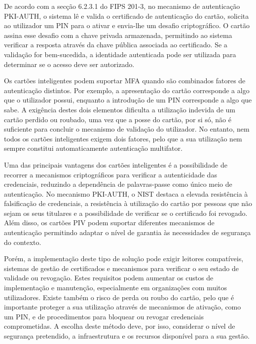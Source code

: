 \hspace{1cm} De acordo com a secção 6.2.3.1 do FIPS 201-3, no mecanismo de autenticação PKI-AUTH, o sistema lê e valida o certificado de autenticação do cartão, solicita ao utilizador um PIN para o ativar e envia-lhe um desafio criptográfico. O cartão assina esse desafio com a chave privada armazenada, permitindo ao sistema verificar a resposta através da chave pública associada ao certificado. Se a validação for bem-sucedida, a identidade autenticada pode ser utilizada para determinar se o acesso deve ser autorizado.

\hspace{1cm} Os cartões inteligentes podem suportar MFA quando são combinados fatores de autenticação distintos. Por exemplo, a apresentação do cartão corresponde a algo que o utilizador possui, enquanto a introdução de um PIN corresponde a algo que sabe. A exigência destes dois elementos dificulta a utilização indevida de um cartão perdido ou roubado, uma vez que a posse do cartão, por si só, não é suficiente para concluir o mecanismo de validação do utilizador. No entanto, nem todos os cartões inteligentes exigem dois fatores, pelo que a sua utilização nem sempre constitui automaticamente autenticação multifator.

\hspace{1cm} Uma das principais vantagens dos cartões inteligentes é a possibilidade de recorrer a mecanismos criptográficos para verificar a autenticidade das credenciais, reduzindo a dependência de palavras-passe como único meio de autenticação. No mecanismo PKI-AUTH, o NIST destaca a elevada resistência à falsificação de credenciais, a resistência à utilização do cartão por pessoas que não sejam os seus titulares e a possibilidade de verificar se o certificado foi revogado. Além disso, os cartões PIV podem suportar diferentes mecanismos de autenticação permitindo adaptar o nível de garantia às necessidades de segurança do contexto.

\hspace{1cm} Porém, a implementação deste tipo de solução pode exigir leitores compatíveis, sistemas de gestão de certificados e mecanismos para verificar o seu estado de validade ou revogação. Estes requisitos podem aumentar os custos de implementação e manutenção, especialmente em organizações com muitos utilizadores. Existe também o risco de perda ou roubo do cartão, pelo que é importante proteger a sua utilização através de mecanismos de ativação, como um PIN, e de procedimentos para bloquear ou revogar credenciais comprometidas. A escolha deste método deve, por isso, considerar o nível de segurança pretendido, a infraestrutura e os recursos disponível para a sua gestão.

